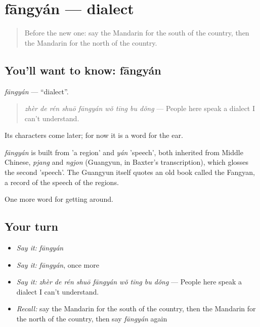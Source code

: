 \section[fāngyán]{fāngyán — dialect}

\label{lesson:ZH-C436-fangyan}



\begin{quote}
Before the new one: say the Mandarin for the south of the country, then the Mandarin for the north of the country.
\end{quote}

\subsection*{You'll want to know: fāngyán}
\emph{fāngyán} — \textquotedblleft{}dialect\textquotedblright{}.

\begin{quote}
\emph{zhèr de rén shuō fāngyán wǒ tīng bu dǒng} — People here speak a dialect I can't understand.
\end{quote}

Its characters come later; for now it is a word for the ear.

\begin{cousinweb}
\emph{fāngyán} is built from  'a region' and \emph{yán} 'speech', both inherited from Middle Chinese, \emph{pjang} and \emph{ngjon} (Guangyun, in Baxter's transcription), which glosses the second 'speech'. The Guangyun itself quotes an old book called the Fangyan, a record of the speech of the regions.
\end{cousinweb}

\begin{grammarlens}[title={What you've built}]
One more word for getting around.
\end{grammarlens}

\subsection*{Your turn}
\begin{itemize}
\raggedright
  \item \emph{Say it:} \emph{fāngyán}
  \item \emph{Say it:} \emph{fāngyán}, once more
  \item \emph{Say it:} \emph{zhèr de rén shuō fāngyán wǒ tīng bu dǒng} — People here speak a dialect I can't understand.
  \item \emph{Recall:} say the Mandarin for the south of the country, then the Mandarin for the north of the country, then say \emph{fāngyán} again
\end{itemize}

